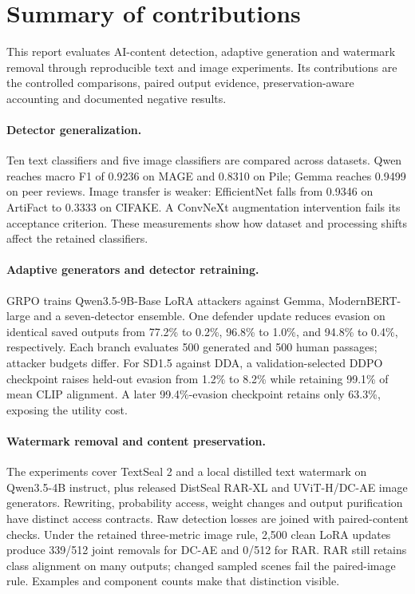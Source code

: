 \section*{Summary of contributions}
This report evaluates AI-content detection, adaptive generation and watermark removal through reproducible text and image experiments. Its contributions are the controlled comparisons, paired output evidence, preservation-aware accounting and documented negative results.

\paragraph{Detector generalization.}
Ten text classifiers and five image classifiers are compared across datasets. Qwen reaches macro F1 of 0.9236 on MAGE and 0.8310 on Pile; Gemma reaches 0.9499 on peer reviews. Image transfer is weaker: EfficientNet falls from 0.9346 on ArtiFact to 0.3333 on CIFAKE. A ConvNeXt augmentation intervention fails its acceptance criterion. These measurements show how dataset and processing shifts affect the retained classifiers.

\paragraph{Adaptive generators and detector retraining.}
GRPO trains Qwen3.5-9B-Base LoRA attackers against Gemma, ModernBERT-large and a seven-detector ensemble. One defender update reduces evasion on identical saved outputs from 77.2\% to 0.2\%, 96.8\% to 1.0\%, and 94.8\% to 0.4\%, respectively. Each branch evaluates 500 generated and 500 human passages; attacker budgets differ. For SD1.5 against DDA, a validation-selected DDPO checkpoint raises held-out evasion from 1.2\% to 8.2\% while retaining 99.1\% of mean CLIP alignment. A later 99.4\%-evasion checkpoint retains only 63.3\%, exposing the utility cost.

\paragraph{Watermark removal and content preservation.}
The experiments cover TextSeal 2 and a local distilled text watermark on Qwen3.5-4B instruct, plus released DistSeal RAR-XL and UViT-H/DC-AE image generators. Rewriting, probability access, weight changes and output purification have distinct access contracts. Raw detection losses are joined with paired-content checks. Under the retained three-metric image rule, 2,500 clean LoRA updates produce 339/512 joint removals for DC-AE and 0/512 for RAR. RAR still retains class alignment on many outputs; changed sampled scenes fail the paired-image rule. Examples and component counts make that distinction visible.

